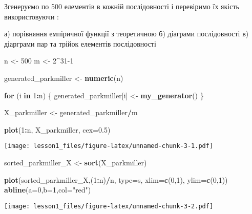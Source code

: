 \documentclass[
]{article}
\newenvironment{Shaded}{\begin{snugshade}}{\end{snugshade}}
\newcommand{\AttributeTok}[1]{\textcolor[rgb]{0.13,0.29,0.53}{#1}}
\newcommand{\ControlFlowTok}[1]{\textcolor[rgb]{0.13,0.29,0.53}{\textbf{#1}}}
\newcommand{\DecValTok}[1]{\textcolor[rgb]{0.00,0.00,0.81}{#1}}
\newcommand{\FloatTok}[1]{\textcolor[rgb]{0.00,0.00,0.81}{#1}}
\newcommand{\FunctionTok}[1]{\textcolor[rgb]{0.13,0.29,0.53}{\textbf{#1}}}
\newcommand{\NormalTok}[1]{#1}
\newcommand{\OtherTok}[1]{\textcolor[rgb]{0.56,0.35,0.01}{#1}}
\newcommand{\SpecialCharTok}[1]{\textcolor[rgb]{0.81,0.36,0.00}{\textbf{#1}}}
\newcommand{\StringTok}[1]{\textcolor[rgb]{0.31,0.60,0.02}{#1}}
\begin{document}
Згенеруємо по 500 елементів в кожній послідовності і перевіримо їх
якість використовуючи :

а) порівняння емпіричної функції з теоретичною б) діаграми послідовності
в) діарграми пар та трійок елементів послідовності

\begin{Shaded}
\begin{Highlighting}[]
\NormalTok{n }\OtherTok{\textless{}{-}} \DecValTok{500}
\NormalTok{m }\OtherTok{\textless{}{-}} \DecValTok{2}\SpecialCharTok{\^{}}\DecValTok{31{-}1}

\NormalTok{generated\_parkmiller }\OtherTok{\textless{}{-}} \FunctionTok{numeric}\NormalTok{(n)}

\ControlFlowTok{for}\NormalTok{ (i }\ControlFlowTok{in} \DecValTok{1}\SpecialCharTok{:}\NormalTok{n) \{}
\NormalTok{  generated\_parkmiller[i] }\OtherTok{\textless{}{-}} \FunctionTok{my\_generator}\NormalTok{()}
\NormalTok{\}}

\NormalTok{X\_parkmiller }\OtherTok{\textless{}{-}}\NormalTok{ generated\_parkmiller}\SpecialCharTok{/}\NormalTok{m}

\FunctionTok{plot}\NormalTok{(}\DecValTok{1}\SpecialCharTok{:}\NormalTok{n, X\_parkmiller, }\AttributeTok{cex=}\FloatTok{0.5}\NormalTok{)}
\end{Highlighting}
\end{Shaded}

\texttt{[image: lesson1\_files/figure-latex/unnamed-chunk-3-1.pdf]}

\begin{Shaded}
\begin{Highlighting}[]
\NormalTok{sorted\_parkmiller\_X }\OtherTok{\textless{}{-}} \FunctionTok{sort}\NormalTok{(X\_parkmiller)}

\FunctionTok{plot}\NormalTok{(sorted\_parkmiller\_X,(}\DecValTok{1}\SpecialCharTok{:}\NormalTok{n)}\SpecialCharTok{/}\NormalTok{n, }\AttributeTok{type=}\StringTok{\textquotesingle{}s\textquotesingle{}}\NormalTok{, }\AttributeTok{xlim=}\FunctionTok{c}\NormalTok{(}\DecValTok{0}\NormalTok{,}\DecValTok{1}\NormalTok{), }\AttributeTok{ylim=}\FunctionTok{c}\NormalTok{(}\DecValTok{0}\NormalTok{,}\DecValTok{1}\NormalTok{))}
\FunctionTok{abline}\NormalTok{(}\AttributeTok{a=}\DecValTok{0}\NormalTok{,}\AttributeTok{b=}\DecValTok{1}\NormalTok{,}\AttributeTok{col=}\StringTok{"red"}\NormalTok{)}
\end{Highlighting}
\end{Shaded}

\texttt{[image: lesson1\_files/figure-latex/unnamed-chunk-3-2.pdf]}
\end{document}
